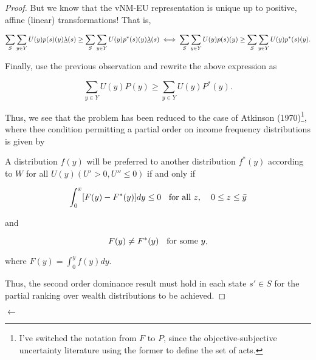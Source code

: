 \documentclass[\econtexRoot/Preproposal]{subfiles}
\begin{document}
\begin{proof}
	\par But we know that the vNM-EU representation is unique up to positive, affine (linear) transformations! That is,
	
$$  \sum_{S} \sum_{y \in Y} U(y)p(s)(y) \underbar{$\lambda$}(s) \geq  \sum_{S} \sum_{y \in Y} U(y)p^{*}(s)(y) \underbar{$\lambda$}(s) \iff \sum_{S} \sum_{y \in Y} U(y)p(s)(y) \geq  \sum_{S} \sum_{y \in Y} U(y)p^{*}(s)(y).$$	

	\par Finally, use the previous observation and rewrite the above expression as
	
$$  \sum_{y \in Y} U(y)P(y) \geq \sum_{y \in Y} U(y)P^*(y).$$	

	\par Thus, we see that the problem has been reduced to the case of Atkinson (1970)\footnote{I've switched the notation from $F$ to $P$, since the objective-subjective uncertainty literature using the former to define the set of acts.}, where thee condition permitting a partial order on income frequency distributions is given by
	
\begin{prop}
A distribution $f(y)$ will be preferred to another distribution $f^{*}(y)$ according to $W$ for all $U(y) (U' > 0, U'' \leq 0)$ if and only if

$$ \int_{0}^{x} [F(y) -F^{*}(y)]dy \leq 0 \text{\hspace{2mm} for all $z$, \hspace{2mm} $0 \leq z \leq \bar{y}$} $$  

and 

$$F(y) \neq F^{*}(y) \text{\hspace{2mm} for some $y$,}$$

where $F(y) = \int_{0}^{y} f(y)dy. $
\end{prop}
	
	\par Thus, the second order dominance result must hold in each state $s' \in S$ for the partial ranking over wealth distributions to be achieved. 
	
\end{proof}	

$\leftarrow$
\end{document}
